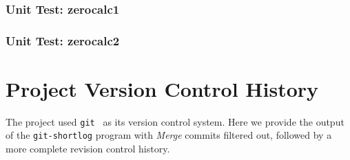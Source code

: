 \subsection*{Unit Test: zerocalc1}

 \clearpage
\subsection*{Unit Test: zerocalc2}

 \clearpage

\chapter{Project Version Control History}
\label{chap:vcshistory}
The \sys{} project used \texttt{git}~\cite{git:website} as its version control system.
Here we provide the output of the \texttt{git-shortlog} program with \emph{Merge}
commits filtered out, followed by a more complete revision control history.


